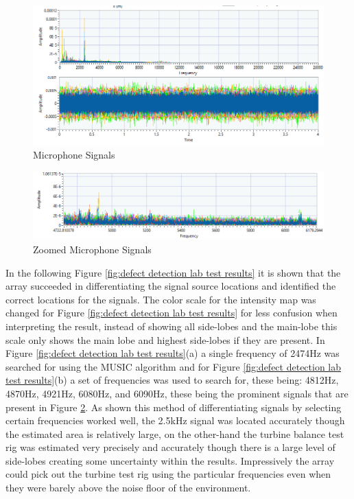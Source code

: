 \documentclass{UoNMCHA}
\numberwithin{equation}{section}
\begin{document}
    \begin{figure} [H]
        \centering
        \includegraphics[keepaspectratio, width = \textwidth]{Figures/Raw Sound Waves.png}
        \caption{Microphone Signals}
        \label{fig:mic signals lab test}
    \end{figure}
    
    \begin{figure} [H]
        \centering
        \includegraphics[keepaspectratio, width = \textwidth]{Figures/Zoomed Sound Waves.png}
        \caption{Zoomed Microphone Signals}
        \label{fig:zoom mic signals lab test}
    \end{figure}
    
    In the following Figure \ref{fig:defect detection lab test results} it is shown that the array succeeded in differentiating the signal source locations and identified the correct locations for the signals. The color scale for the intensity map was changed for Figure \ref{fig:defect detection lab test results} for less confusion when interpreting the result, instead of showing all side-lobes and the main-lobe this scale only shows the main lobe and highest side-lobes if they are present. In Figure \ref{fig:defect detection lab test results}(a) a single frequency of 2474Hz was searched for using the MUSIC algorithm and for Figure \ref{fig:defect detection lab test results}(b) a set of frequencies was used to search for, these being: 4812Hz, 4870Hz, 4921Hz, 6080Hz, and 6090Hz, these being the prominent signals that are present in Figure \ref{fig:zoom mic signals lab test}. As shown this method of differentiating signals by selecting certain frequencies worked well, the 2.5kHz signal was located  accurately though the estimated area is relatively large, on the other-hand the turbine balance test rig was estimated very precisely and accurately though there is a large level of side-lobes creating some uncertainty within the results. Impressively the array could pick out the turbine test rig using the particular frequencies even when they were barely above the noise floor of the environment.
    
\end{document}

